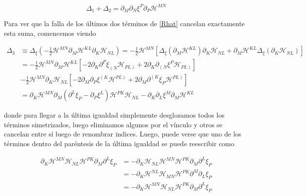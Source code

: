 \documentclass{article}
\numberwithin{equation}{section}
\begin{document}
\begin{equation}\label{key}
\Delta_1 + \Delta_2 = \partial_M\partial_N\xi^P\partial_P\mathcal{H}^{MN} 
\end{equation} 

Para ver que la falla de los últimos dos términos de \ref{Rhat} cancelan exactamente esta suma, comencemos viendo

\begin{equation}\label{key}
\begin{aligned}
\Delta_3 &\equiv \Delta_{\xi} \left(- \frac{1}{2} \mathcal{H}^{MN}\partial_M \mathcal{H}^{KL}\partial_K \mathcal{H}_{NL}\right) = - \frac{1}{2} \mathcal{H}^{MN} \left[\Delta_{\xi}\left( \partial_M \mathcal{H}^{KL} \right)\partial_K \mathcal{H}_{NL} + \partial_M \mathcal{H}^{KL}\Delta_{\xi}\left(\partial_K \mathcal{H}_{NL}\right)\right]\\
&= - \frac{1}{2} \mathcal{H}^{MN}\partial_M \mathcal{H}^{KL} \left[ - 2\partial_K \partial^P \xi_{\left(N\right.} \mathcal{H}_{\left.PL\right)} + 2\partial_K \partial_{\left(N\right.}\xi^P \mathcal{H}_{\left.PL\right)}  \right]\\
&- \frac{1}{2} \mathcal{H}^{MN}\partial_K \mathcal{H}_{NL} \left[ - 2\partial_M \partial_P \xi^{\left(K\right.} \mathcal{H}^{\left.PL\right)} + 2\partial_M \partial^{\left(K\right.}\xi_P \mathcal{H}^{\left.PL\right)}  \right]\\
&= \partial_K \mathcal{H}^{MN}\partial_M \left( \partial^L \xi_P - \partial_P \xi^L\right) \mathcal{H}^{PK}\mathcal{H}_{NL} - \partial_K\partial_L\xi^M\partial_M\mathcal{H}^{KL}
\end{aligned}
\end{equation}

donde para llegar a la última igualdad simplemente desglozamos todos los términos simetrizados, luego eliminamos algunos por el vínculo y otros se cancelan entre sí luego de renombrar indices. Luego, puede verse que uno de los términos dentro del paréntesis de la última igualdad se puede reescribir como

\begin{equation}\label{menoselmismo}
\begin{aligned}
\partial_K \mathcal{H}^{MN}\mathcal{H}_{NL}\mathcal{H}^{PK}\partial_M\partial^L \xi_P &= 
-\partial_K \mathcal{H}_{NL}\mathcal{H}^{MN}\mathcal{H}^{PK}\partial_M\partial^L \xi_P\\
&=-\partial_K \mathcal{H}^{NL}\mathcal{H}_{MN}\mathcal{H}^{PK}\partial^M\partial_L \xi_P\\
&=-\partial_K \mathcal{H}^{MN}\mathcal{H}_{NL}\mathcal{H}^{PK}\partial_M\partial^L \xi_P
\end{aligned}
\end{equation}
\end{document}
